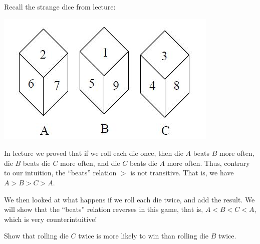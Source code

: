 \documentclass[12pt,twoside]{article}
\begin{document}
\begin{problem}{15}
Recall the strange dice from lecture:
\begin{center}
\includegraphics{dice.jpg}
\end{center}
In lecture we proved that if we roll each die once, then die $A$ beats $B$ more often, die $B$ beats die $C$ more often, and die $C$ beats die $A$ more often. Thus, contrary to our intuition, the ``beats'' relation $>$ is not transitive. That is, we have $A > B > C > A$.

We then looked at what happens if we roll each die twice, and add the result. We will show that the ``beats'' relation reverses in this game, that is, $A < B < C < A$, which is very counterintuitive!

\bparts

Show that rolling die $C$ twice is more likely to win than rolling die $B$ twice.

\end{problem}
\end{document}
